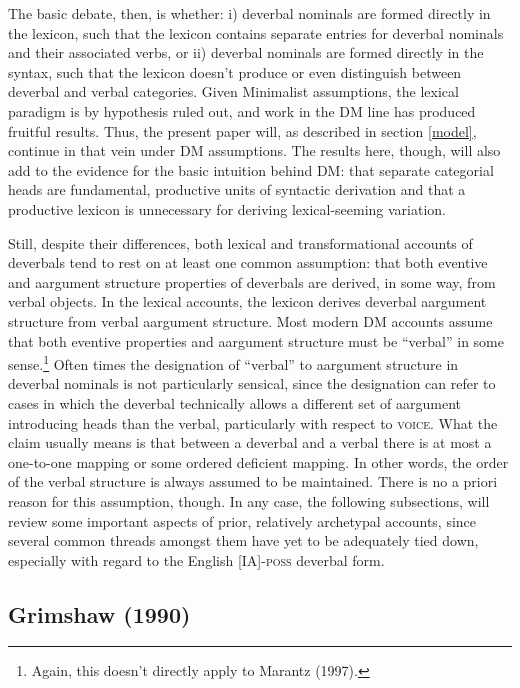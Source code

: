 \documentclass[12pt]{article}
\begin{document}
The basic debate, then, is whether: i) deverbal nominals are formed directly in the lexicon, such that the lexicon contains separate entries for deverbal nominals and their associated verbs, or ii) deverbal nominals are formed directly in the syntax, such that the lexicon doesn’t produce or even distinguish between deverbal and verbal categories. Given Minimalist assumptions, the lexical paradigm is by hypothesis ruled out, and work in the DM line has produced fruitful results. Thus, the present paper will, as described in section \ref{model}, continue in that vein under DM assumptions. The results here, though, will also add to the evidence for the basic intuition behind DM: that separate categorial heads are fundamental, productive units of syntactic derivation and that a productive lexicon is unnecessary for deriving lexical-seeming variation.

Still, despite their differences, both lexical and transformational accounts of deverbals tend to rest on at least one common assumption: that both eventive and aargument structure properties of deverbals are derived, in some way, from verbal objects. In the lexical accounts, the lexicon derives deverbal aargument structure from verbal aargument structure. Most modern DM accounts assume that both eventive properties and aargument structure must be ``verbal'' in some sense.\footnote{ Again, this doesn't directly apply to Marantz (1997).} Often times the designation of ``verbal'' to aargument structure in deverbal nominals is not particularly sensical, since the designation can refer to cases in which the deverbal technically allows a different set of aargument introducing heads than the verbal, particularly with respect to \textsc{voice}. What the claim usually means is that between a deverbal and a verbal there is at most a one-to-one mapping or some ordered deficient mapping. In other words, the order of the verbal structure is always assumed to be maintained. There is no a priori reason for this assumption, though. In any case, the following subsections, will review some important aspects of prior, relatively archetypal accounts, since several common threads amongst them have yet to be adequately tied down, especially with regard to the English [IA]-\textsc{poss} deverbal form.

\subsection{Grimshaw (1990)}\label{priors2}
\end{document}
